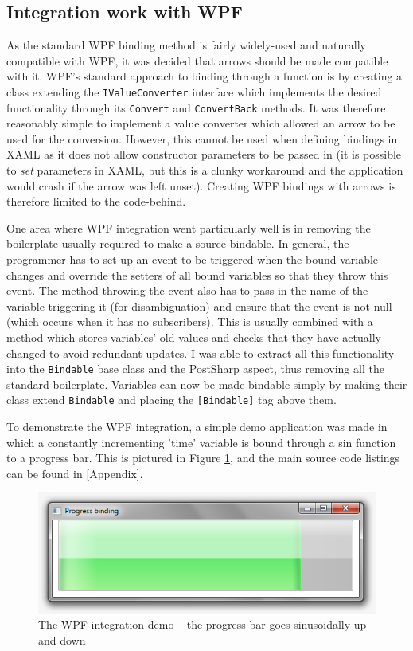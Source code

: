 \documentclass[12pt,twoside,notitlepage]{report}
\begin{document}
\subsection{Integration work with WPF}

As the standard WPF binding method is fairly widely-used and naturally compatible with WPF, it was decided that arrows should be made compatible with it. WPF's standard approach to binding through a function is by creating a class extending the \texttt{IValueConverter} interface which implements the desired functionality through its \texttt{Convert} and \texttt{ConvertBack} methods. It was therefore reasonably simple to implement a value converter which allowed an arrow to be used for the conversion. However, this cannot be used when defining bindings in XAML as it does not allow constructor parameters to be passed in (it is possible to \textit{set} parameters in XAML, but this is a clunky workaround and the application would crash if the arrow was left unset). Creating WPF bindings with arrows is therefore limited to the code-behind.

One area where WPF integration went particularly well is in removing the boilerplate usually required to make a source bindable. In general, the programmer has to set up an event to be triggered when the bound variable changes and override the setters of all bound variables so that they throw this event. The method throwing the event also has to pass in the name of the variable triggering it (for disambiguation) and ensure that the event is not null (which occurs when it has no subscribers). This is usually combined with a method which stores variables' old values and checks that they have actually changed to avoid redundant updates. I was able to extract all this functionality into the \texttt{Bindable} base class and the PostSharp aspect, thus removing all the standard boilerplate. Variables can now be made bindable simply by making their class extend \texttt{Bindable} and placing the \texttt{[Bindable]} tag above them.

To demonstrate the WPF integration, a simple demo application was made in which a constantly incrementing 'time' variable is bound through a sin function to a progress bar. This is pictured in Figure \ref{fig:wpf_integration_demo}, and the main source code listings can be found in [Appendix].

\begin{figure}[!ht]
  \centering
  \includegraphics[width=\textwidth]{fig/WPFIntegrationDemo.png}
  \caption{The WPF integration demo -- the progress bar goes sinusoidally up and down}
  \label{fig:wpf_integration_demo}
\end{figure}
\end{document}
